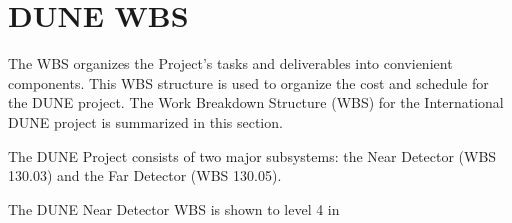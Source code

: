 \section{DUNE WBS}

The WBS organizes the Project's tasks and deliverables into convienient components. 
This WBS structure is used to organize the cost and schedule for the DUNE project.
The Work Breakdown Structure (WBS) for the International DUNE project is summarized
in this section.

The DUNE Project consists of two major subsystems: the Near Detector (WBS 130.03) and
the Far Detector (WBS 130.05).

The DUNE Near Detector WBS is shown to level 4 in 
